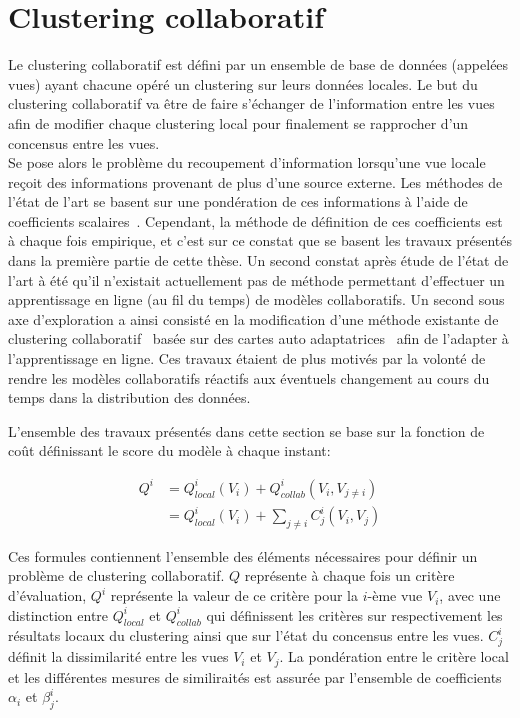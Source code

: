 \documentclass[a4paper]{article}
\begin{document}
\section{Clustering collaboratif}


Le clustering collaboratif est défini par un ensemble de base de données (appelées vues) ayant chacune opéré un clustering sur leurs données locales. Le but du clustering collaboratif va \^{e}tre de faire s'échanger de l'information entre les vues afin de modifier chaque clustering local pour finalement se rapprocher d'un concensus entre les vues.\\

Se pose alors le problème du recoupement d'information lorsqu'une vue locale reçoit des informations provenant de plus d'une source externe. Les méthodes de l'état de l'art se basent sur une pondération de ces informations à l'aide de coefficients scalaires~\cite{cornuejols2018collaborative,pedrycz2002collaborative,maurel2017incremental,ghassany2012collaborative,sublime2016collaborative,rastin2015collaborative}. Cependant, la méthode de définition de ces coefficients est à chaque fois empirique, et c'est sur ce constat que se basent les travaux présentés dans la première partie de cette thèse. Un second constat après étude de l'état de l'art à été qu'il n'existait actuellement pas de méthode permettant d'effectuer un apprentissage en ligne (au fil du temps) de modèles collaboratifs. Un second sous axe d'exploration a ainsi consisté en la modification d'une méthode existante de clustering collaboratif~\cite{ghassany2012collaborative} basée sur des cartes auto adaptatrices~\cite{KOHO1} afin de l'adapter à l'apprentissage en ligne. Ces travaux étaient de plus motivés par la volonté de rendre les modèles collaboratifs réactifs aux éventuels changement au cours du temps dans la distribution des données.

L'ensemble des travaux présentés dans cette section se base sur la fonction de co\^{u}t définissant le score du modèle à chaque instant:

\begin{align}
    \label{eq:sum_globalC}
    Q^i &= Q^i_{local}(V_i) + Q^i_{collab}(V_i, V_{j\neq i})\\
    &= Q^i_{local}(V_i) + \sum_{j\neq i} C_j^i(V_i, V_j)
\end{align}

Ces formules contiennent l'ensemble des éléments nécessaires pour définir un problème de clustering collaboratif. $Q$ représente à chaque fois un critère d'évaluation, $Q^i$ représente la valeur de ce critère pour la $i$-ème vue $V_i$, avec une distinction entre $Q^i_{local}$ et $Q^i_{collab}$ qui définissent les critères sur respectivement les résultats locaux du clustering ainsi que sur l'état du concensus entre les vues. $C_j^i$ définit la dissimilarité entre les vues $V_i$ et $V_j$. La pondération entre le critère local et les différentes mesures de similiraités est assurée par l'ensemble de coefficients $\alpha_i$ et $\beta_j^i$.
\end{document}
